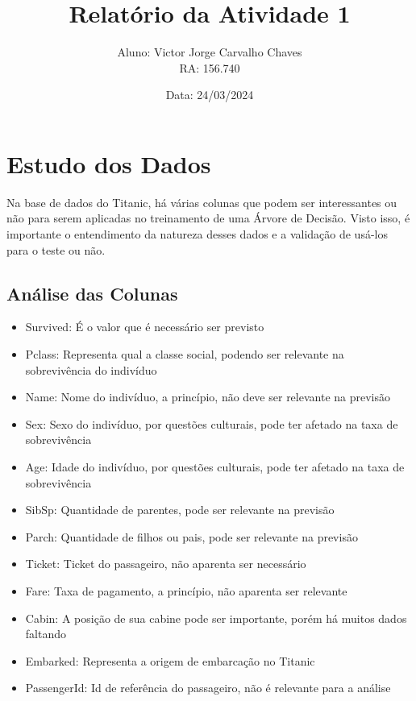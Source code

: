 \documentclass[a4paper,11pt]{article}
\title{Relatório da Atividade 1}
\author{Aluno: Victor Jorge Carvalho Chaves \\ RA: 156.740}
\date{Data: 24/03/2024}
\begin{document}
\maketitle

\section{Estudo dos Dados}

Na base de dados do Titanic, há várias colunas que podem ser interessantes ou não para serem aplicadas no treinamento de uma Árvore de Decisão. Visto isso, é importante o entendimento da natureza desses dados e a validação de usá-los para o teste ou não.

\subsection{Análise das Colunas}

\begin{itemize}[label=--]
    \item Survived: É o valor que é necessário ser previsto
    \item Pclass: Representa qual a classe social, podendo ser relevante na sobrevivência do indivíduo
    \item Name: Nome do indivíduo, a princípio, não deve ser relevante na previsão
    \item Sex: Sexo do indivíduo, por questões culturais, pode ter afetado na taxa de sobrevivência
    \item Age: Idade do indivíduo, por questões culturais, pode ter afetado na taxa de sobrevivência
    \item SibSp: Quantidade de parentes, pode ser relevante na previsão
    \item Parch: Quantidade de filhos ou pais, pode ser relevante na previsão
    \item Ticket: Ticket do passageiro, não aparenta ser necessário
    \item Fare: Taxa de pagamento, a princípio, não aparenta ser relevante
    \item Cabin: A posição de sua cabine pode ser importante, porém há muitos dados faltando
    \item Embarked: Representa a origem de embarcação no Titanic
    \item PassengerId: Id de referência do passageiro, não é relevante para a análise
\end{itemize}

\pagebreak
\end{document}
